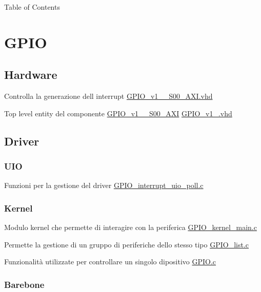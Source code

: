 \begin{DoxyParagraph}{Table of Contents}

\end{DoxyParagraph}
\hypertarget{index_GPIO}{}\section{G\+P\+IO}\label{index_GPIO}
\hypertarget{index_Hardware}{}\subsection{Hardware}\label{index_Hardware}

\begin{DoxyItemize}
\item Controlla la generazione dell\textquotesingle{} interrupt \hyperlink{GPIO__v1__0__S00__AXI_8vhd}{G\+P\+I\+O\+\_\+v1\+\_\+\_\+\+S00\+\_\+\+A\+X\+I.\+vhd}
\item Top level entity del componente \hyperlink{classGPIO__v1__0__S00__AXI}{G\+P\+I\+O\+\_\+v1\+\_\+\_\+\+S00\+\_\+\+A\+XI} \hyperlink{GPIO__v1__0_8vhd}{G\+P\+I\+O\+\_\+v1\+\_.\+vhd} 
\end{DoxyItemize}\hypertarget{index_Driver}{}\subsection{Driver}\label{index_Driver}
\hypertarget{index_UIO}{}\subsubsection{U\+IO}\label{index_UIO}

\begin{DoxyItemize}
\item Funzioni per la gestione del driver \hyperlink{GPIO__interrupt__uio__poll_8c}{G\+P\+I\+O\+\_\+interrupt\+\_\+uio\+\_\+poll.\+c} 
\end{DoxyItemize}\hypertarget{index_Kernel}{}\subsubsection{Kernel}\label{index_Kernel}

\begin{DoxyItemize}
\item Modulo kernel che permette di interagire con la periferica \hyperlink{GPIO__kernel__main_8c}{G\+P\+I\+O\+\_\+kernel\+\_\+main.\+c}
\item Permette la gestione di un gruppo di periferiche dello stesso tipo \hyperlink{GPIO__list_8c}{G\+P\+I\+O\+\_\+list.\+c}
\item Funzionalità utilizzate per controllare un singolo dipositivo \hyperlink{GPIO_8c}{G\+P\+I\+O.\+c} 
\end{DoxyItemize}\hypertarget{index_Barebone}{}\subsubsection{Barebone}\label{index_Barebone}

